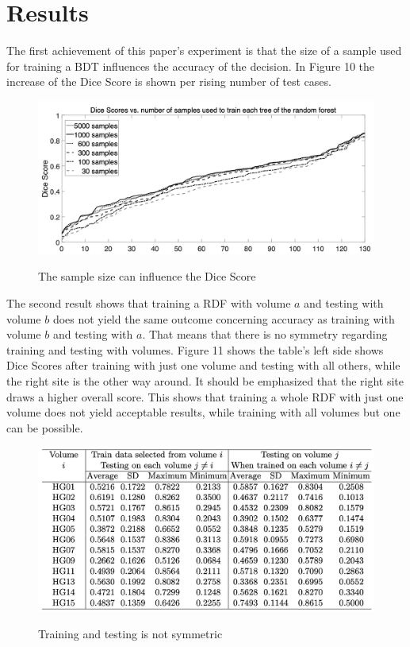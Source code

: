 \documentclass[
12pt,
headsepline,
bibliography=totoc,
twoside=semi,
fleqn
]{scrartcl}
\begin{document}
 \newpage
\section{Results\label{sec:sec4}}

 The first achievement of this paper's experiment is that the size of a sample used for training a BDT influences the accuracy of the decision. In Figure 10 the increase of the Dice Score is shown per rising number of test cases.
 
 \begin{figure}[H]
 \centering \includegraphics[scale=0.7]{BDT16.png}\label{fig:test}
 \caption{The sample size can influence the Dice Score}
 \end{figure} 

 The second result shows that training a RDF with volume $a$ and testing with volume $b$ does not yield the same outcome concerning accuracy as training with volume $b$ and testing with $a$. That means that there is no symmetry regarding training and testing with volumes. Figure 11 shows the table's left side shows Dice Scores after training with just one volume and testing with all others, while the right site is the other way around. It should be emphasized that the right site draws a higher overall score. This shows that training a whole RDF with just one volume does not yield acceptable results, while training with all volumes but one can be possible. 

\newpage

 \begin{figure}[H]
 \centering \includegraphics[scale=0.7]{BDT17.png}\label{fig:fig17}
 \caption{Training and testing is not symmetric}
 \end{figure} 
\end{document}
